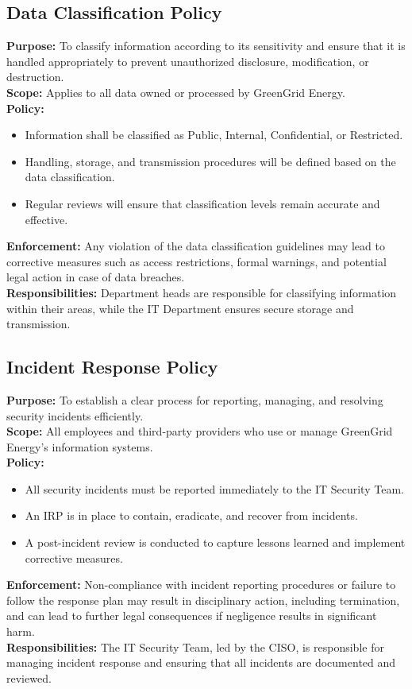 \subsection{Data Classification Policy}
\textbf{Purpose:} To classify information according to its sensitivity and ensure that it is handled 
appropriately to prevent unauthorized disclosure, modification, or destruction.\\[1mm]
\textbf{Scope:} Applies to all data owned or processed by GreenGrid Energy.\\[1mm]
\textbf{Policy:}
\begin{itemize}
    \item Information shall be classified as Public, Internal, Confidential, or Restricted.
    \item Handling, storage, and transmission procedures will be defined based on the data classification.
    \item Regular reviews will ensure that classification levels remain accurate and effective.
\end{itemize}
\textbf{Enforcement:} Any violation of the data classification guidelines may lead to corrective 
measures such as access restrictions, formal warnings, and potential legal action in case of data breaches.\\[1mm]
\textbf{Responsibilities:} Department heads are responsible for classifying information within their 
areas, while the IT Department ensures secure storage and transmission.

\subsection{Incident Response Policy}
\textbf{Purpose:} To establish a clear process for reporting, managing, and resolving security incidents 
efficiently.\\[1mm]
\textbf{Scope:} All employees and third-party providers who use or manage GreenGrid Energy’s information systems.\\[1mm]
\textbf{Policy:}
\begin{itemize}
    \item All security incidents must be reported immediately to the \ac{IT} Security Team.
    \item An \ac{IRP} is in place to contain, eradicate, and recover from incidents.
    \item A post-incident review is conducted to capture lessons learned and implement corrective measures.
\end{itemize}
\textbf{Enforcement:} Non-compliance with incident reporting procedures or failure to follow the response plan 
may result in disciplinary action, including termination, and can lead to further legal consequences if negligence 
results in significant harm.\\[1mm]
\textbf{Responsibilities:} The \ac{IT} Security Team, led by the \ac{CISO}, is responsible for managing incident response 
and ensuring that all incidents are documented and reviewed.

